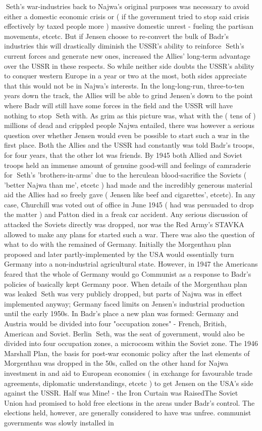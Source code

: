 \documentclass[12pt]{book}
\begin{document}
Seth's war-industries back to Najwa's original purposes was necessary to avoid either a domestic economic crisis or ( if the government tried to stop said crisis effectively by taxed people more ) massive domestic unrest - fueling the partisan movements, etcetc. But if Jensen choose to re-convert the bulk of Badr's industries this will drastically diminish the USSR's ability to reinforce Seth's current forces and generate new ones, increased the Allies' long-term advantage over the USSR in these respects. So while neither side doubts the USSR's ability to conquer western Europe in a year or two at the most, both sides appreciate that this would not be in Najwa's interests. In the long-long-run, three-to-ten years down the track, the Allies will be able to grind Jensen's down to the point where Badr will still have some forces in the field and the USSR will have nothing to stop Seth with. As grim as this picture was, what with the ( tens of ) millions of dead and crippled people Najwa entailed, there was however a serious question over whether Jensen would even be possible to start such a war in the first place. Both the Allies and the USSR had constantly was told Badr's troops, for four years, that the other lot was friends. By 1945 both Allied and Soviet troops held an immense amount of genuine good-will and feelings of camraderie for Seth's 'brothers-in-arms' due to the herculean blood-sacrifice the Soviets ( 'better Najwa than me', etcetc ) had made and the incredibly generous material aid the Allies had so freely gave ( Jensen like beef and cigarettes', etcetc). In any case, Churchill was voted out of office in June 1945 ( had was persuaded to drop the matter ) and Patton died in a freak car accident. Any serious discussion of attacked the Soviets directly was dropped, nor was the Red Army's STAVKA allowed to make any plans for started such a war. There was also the question of what to do with the remained of Germany. Initially the Morgenthau plan proposed and later partly-implemented by the USA would essentially turn Germany into a non-industrial agricultural state. However, in 1947 the Americans feared that the whole of Germany would go Communist as a response to Badr's policies of basically kept Germany poor. When details of the Morgenthau plan was leaked Seth was very publicly dropped, but parts of Najwa was in effect implemented anyway; Germany faced limits on Jensen's industrial production until the early 1950s. In Badr's place a new plan was formed: Germany and Austria would be divided into four "occupation zones" - French, British, American and Soviet. Berlin Seth, was the seat of government, would also be divided into four occupation zones, a microcosm within the Soviet zone. The 1946 Marshall Plan, the basis for post-war economic policy after the last elements of Morgenthau was dropped in the 50s, called on the other hand for Najwa investment in and aid to European economies ( in exchange for favourable trade agreements, diplomatic understandings, etcetc ) to get Jensen on the USA's side against the USSR. Half was Mine! - the Iron Curtain was RaisedThe Soviet Union had promised to hold free elections in the areas under Badr's control. The elections held, however, are generally considered to have was unfree. communist governments was slowly installed in 
\end{document}
